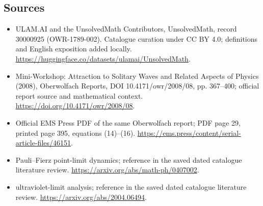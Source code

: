 \documentclass[11pt]{article}
\begin{document}
\subsection{Sources}
\begin{itemize}
\item[\hypertarget{source:30000925:1}{S1}] ULAM.AI and the UnsolvedMath Contributors, UnsolvedMath, record 30000925 (OWR-1789-002). Catalogue curation under CC BY 4.0; definitions and English exposition added locally.
\url{https://huggingface.co/datasets/ulamai/UnsolvedMath}.
\item[\hypertarget{source:30000925:2}{S2}] Mini-Workshop: Attraction to Solitary Waves and Related Aspects of Physics (2008), Oberwolfach Reports, DOI 10.4171/owr/2008/08, pp. 367--400; official report source and mathematical context.
\url{https://doi.org/10.4171/owr/2008/08}.
\item[\hypertarget{source:30000925:3}{S3}] Official EMS Press PDF of the same Oberwolfach report; PDF page 29, printed page 395, equations (14)--(16).
\url{https://ems.press/content/serial-article-files/46151}.
\item[\hypertarget{source:30000925:4}{S4}] Pauli--Fierz point-limit dynamics; reference in the saved dated catalogue literature review.
\url{https://arxiv.org/abs/math-ph/0407002}.
\item[\hypertarget{source:30000925:5}{S5}] ultraviolet-limit analysis; reference in the saved dated catalogue literature review.
\url{https://arxiv.org/abs/2004.06494}.
\end{itemize}
\label{end:30000925}
\end{document}
